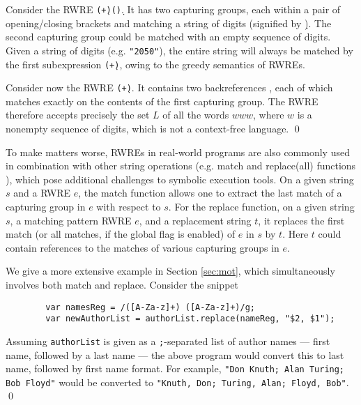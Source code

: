 \begin{example}
    Consider the RWRE \texttt{(\d+)(\d*)}. It has two capturing
    groups, each within a pair of opening/closing brackets and  matching
    a string of digits (signified by \texttt{\d}). The second 
    capturing group
    could be matched with an empty sequence of digits. Given a string of digits
    (e.g. \texttt{"2050"}), the entire string will always be matched by the
    first subexpression \texttt{(\d+)}, owing to the greedy semantics of
    RWREs. 

    Consider now the RWRE \texttt{(\d+)\1\1}. It contains two
    backreferences \texttt{\1}, each of which
    matches exactly on the contents of the first capturing group. The RWRE therefore
    accepts precisely the set $L$ of all the words $www$, where $w$ is a 
    nonempty sequence of digits, which is not a context-free language.
    \qed
\end{example}


To make matters worse,
RWREs in real-world programs are also commonly used in combination with
other string operations (e.g. match and replace(all) functions \cite{LMK19}),
which pose additional challenges to symbolic execution tools.
On a given string $s$ and a RWRE $e$, the match function allows one to extract 
the last match of a capturing group in $e$ with respect to $s$. 
For the replace function, on a given string $s$, a matching pattern RWRE $e$, and a replacement string $t$, it replaces the first match (or all 
matches, if the global flag is enabled) of $e$ in $s$ by $t$. Here $t$
could contain references to the matches of various capturing groups
in $e$. 
\begin{example}\label{exmp-name-swap}
    We give a more extensive example in Section \ref{sec:mot}, which 
    simultaneously involves both match and replace. Consider the snippet
    \begin{verbatim}
        var namesReg = /([A-Za-z]+) ([A-Za-z]+)/g;
        var newAuthorList = authorList.replace(nameReg, "$2, $1");
    \end{verbatim}
    Assuming \texttt{authorList} is given as a \texttt{;}-separated 
    list of author names --- first name, followed by a last name ---
    the above program would convert this to last name, followed by first name
    format. For example, \texttt{"Don Knuth; Alan Turing; Bob Floyd"} would
    be converted to \texttt{"Knuth, Don; Turing, Alan; Floyd, Bob"}.
    \qed
\end{example}

